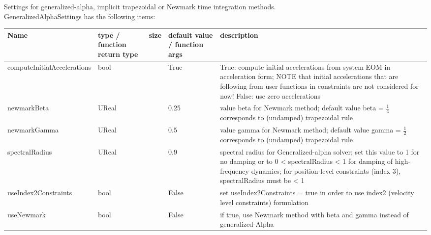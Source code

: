  \label{sec:GeneralizedAlphaSettings}
Settings for generalized-alpha, implicit trapezoidal or Newmark time integration methods.\\ 
%
GeneralizedAlphaSettings has the following items:
\begin{center}
  \footnotesize
  \begin{longtable}{| p{4.2cm} | p{2.5cm} | p{0.3cm} | p{3.0cm} | p{6cm} |}
    \hline
    \bf Name & \bf type / function return type & \bf size & \bf default value / function args & \bf description \\ \hline
    computeInitialAccelerations &     bool &      &     True &     True: compute initial accelerations from system EOM in acceleration form; NOTE that initial accelerations that are following from user functions in constraints are not considered for now! False: use zero accelerations\\ \hline
    newmarkBeta &     UReal &      &     0.25 &     value beta for Newmark method; default value beta = $\frac 1 4$ corresponds to (undamped) trapezoidal rule\\ \hline
    newmarkGamma &     UReal &      &     0.5 &     value gamma for Newmark method; default value gamma = $\frac 1 2$ corresponds to (undamped) trapezoidal rule\\ \hline
    spectralRadius &     UReal &      &     0.9 &     spectral radius for Generalized-alpha solver; set this value to 1 for no damping or to 0 < spectralRadius < 1 for damping of high-frequency dynamics; for position-level constraints (index 3), spectralRadius must be < 1\\ \hline
    useIndex2Constraints &     bool &      &     False &     set useIndex2Constraints = true in order to use index2 (velocity level constraints) formulation\\ \hline
    useNewmark &     bool &      &     False &     if true, use Newmark method with beta and gamma instead of generalized-Alpha\\ \hline
	  \end{longtable}
	\end{center}

